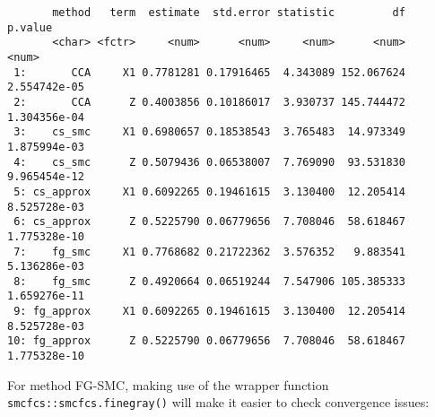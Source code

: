\documentclass[
  12pt,
  a4paper,
]{article}
\newenvironment{Shaded}{\begin{snugshade}}{\end{snugshade}}
\newcommand{\AttributeTok}[1]{\textcolor[rgb]{0.40,0.45,0.13}{#1}}
\newcommand{\CommentTok}[1]{\textcolor[rgb]{0.37,0.37,0.37}{#1}}
\newcommand{\DecValTok}[1]{\textcolor[rgb]{0.68,0.00,0.00}{#1}}
\newcommand{\FunctionTok}[1]{\textcolor[rgb]{0.28,0.35,0.67}{#1}}
\newcommand{\NormalTok}[1]{\textcolor[rgb]{0.00,0.23,0.31}{#1}}
\newcommand{\OtherTok}[1]{\textcolor[rgb]{0.00,0.23,0.31}{#1}}
\newcommand{\SpecialCharTok}[1]{\textcolor[rgb]{0.37,0.37,0.37}{#1}}
\newcommand{\StringTok}[1]{\textcolor[rgb]{0.13,0.47,0.30}{#1}}
\begin{document}
\begin{verbatim}
       method   term  estimate  std.error statistic         df      p.value
       <char> <fctr>     <num>      <num>     <num>      <num>        <num>
 1:       CCA     X1 0.7781281 0.17916465  4.343089 152.067624 2.554742e-05
 2:       CCA      Z 0.4003856 0.10186017  3.930737 145.744472 1.304356e-04
 3:    cs_smc     X1 0.6980657 0.18538543  3.765483  14.973349 1.875994e-03
 4:    cs_smc      Z 0.5079436 0.06538007  7.769090  93.531830 9.965454e-12
 5: cs_approx     X1 0.6092265 0.19461615  3.130400  12.205414 8.525728e-03
 6: cs_approx      Z 0.5225790 0.06779656  7.708046  58.618467 1.775328e-10
 7:    fg_smc     X1 0.7768682 0.21722362  3.576352   9.883541 5.136286e-03
 8:    fg_smc      Z 0.4920664 0.06519244  7.547906 105.385333 1.659276e-11
 9: fg_approx     X1 0.6092265 0.19461615  3.130400  12.205414 8.525728e-03
10: fg_approx      Z 0.5225790 0.06779656  7.708046  58.618467 1.775328e-10
\end{verbatim}

For method FG-SMC, making use of the wrapper function
\texttt{smcfcs::smcfcs.finegray()} will make it easier to check
convergence issues:

\begin{Shaded}
\end{Shaded}
\end{document}
